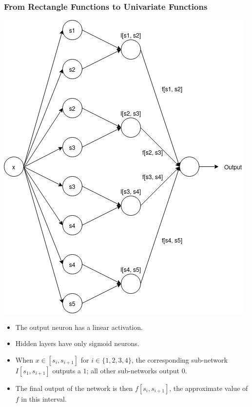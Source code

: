\documentclass[11pt]{beamer}
\begin{document}
\begin{frame}[t]
\frametitle{From Rectangle Functions to Univariate Functions}
\begin{minipage}[b]{0.3\textwidth}
\begin{center}
\includegraphics[scale=0.3]{OneVariableFunctions.jpg}
\end{center}
\end{minipage}
\hfill
\begin{minipage}[b]{0.5\textwidth}
{\small
\begin{itemize}
    \item The output neuron has a linear activation.
    \item Hidden layers have only sigmoid neurons.
    \item When $x \in [s_i, s_{i + 1}]$ for $i \in \{1, 2, 3, 4\}$,
        the corresponding sub-network $I[s_1, s_{i + 1}]$ outputs a $1$;
        all other sub-networks output $0$.
    \item The final output of the network is then $f[s_i, s_{i + 1}]$,
        the approximate value of $f$ in this interval.
\end{itemize}
}
\end{minipage}
\end{frame}
\end{document}
